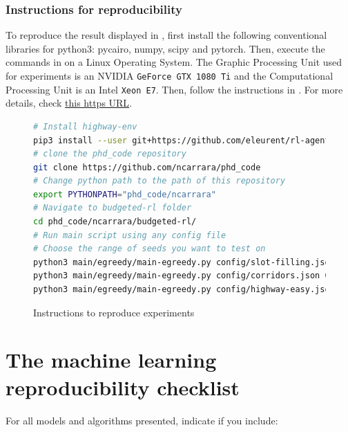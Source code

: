 \subsubsection{Instructions for reproducibility}
\label{subsubsec:instruction-reproducibility}
To reproduce the result displayed in , first install the following conventional libraries for python3: pycairo, numpy, scipy and pytorch. Then, execute the commands in  on a Linux Operating System. The Graphic Processing Unit used for experiments is an NVIDIA \texttt{GeForce GTX 1080 Ti} and the Computational Processing Unit is an Intel \texttt{Xeon E7}. Then, follow the instructions in . For more details, check  \href{https://budgeted-rl.github.io/\#how-to-reproduce}{this https URL}.

\begin{figure}
    \centering
    

\begin{lstlisting}[language=bash,caption={bash version}]
# Install highway-env
pip3 install --user git+https://github.com/eleurent/rl-agents
# clone the phd_code repository
git clone https://github.com/ncarrara/phd_code
# Change python path to the path of this repository
export PYTHONPATH="phd_code/ncarrara"
# Navigate to budgeted-rl folder
cd phd_code/ncarrara/budgeted-rl/
# Run main script using any config file
# Choose the range of seeds you want to test on
python3 main/egreedy/main-egreedy.py config/slot-filling.json 0 6
python3 main/egreedy/main-egreedy.py config/corridors.json 0 4
python3 main/egreedy/main-egreedy.py config/highway-easy.json 0 10
\end{lstlisting}

\caption{Instructions to reproduce experiments}
    \label{fig:instructions}
\end{figure}


\section{The machine learning reproducibility checklist}
\label{sec:ml-checklist}
For all models and algorithms presented, indicate if you include: 

